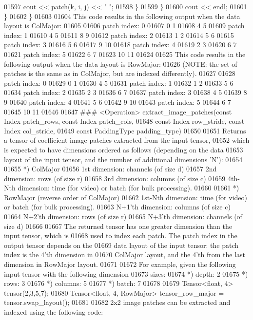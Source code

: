 \begin{DoxyCode}
01597           cout << patch(k, i, j) << " ";
01598         \}
01599       \}
01600       cout << endl;
01601     \}
01602   \}
01603 
01604 This code results in the following output when the data layout is ColMajor:
01605 
01606 patch index: 0
01607 0 1
01608 4 5
01609 patch index: 1
01610 4 5
01611 8 9
01612 patch index: 2
01613 1 2
01614 5 6
01615 patch index: 3
01616 5 6
01617 9 10
01618 patch index: 4
01619 2 3
01620 6 7
01621 patch index: 5
01622 6 7
01623 10 11
01624 
01625 This code results in the following output when the data layout is RowMajor:
01626 (NOTE: the set of patches is the same as in ColMajor, but are indexed differently).
01627 
01628 patch index: 0
01629 0 1
01630 4 5
01631 patch index: 1
01632 1 2
01633 5 6
01634 patch index: 2
01635 2 3
01636 6 7
01637 patch index: 3
01638 4 5
01639 8 9
01640 patch index: 4
01641 5 6
01642 9 10
01643 patch index: 5
01644 6 7
01645 10 11
01646 
01647 ### <Operation>  extract\_image\_patches(const Index patch\_rows, const Index patch\_cols,
01648                           const Index row\_stride, const Index col\_stride,
01649                           const PaddingType padding\_type)
01650 
01651 Returns a tensor of coefficient image patches extracted from the input tensor,
01652 which is expected to have dimensions ordered as follows (depending on the data
01653 layout of the input tensor, and the number of additional dimensions 'N'):
01654 
01655 *) ColMajor
01656 1st dimension: channels (of size d)
01657 2nd dimension: rows (of size r)
01658 3rd dimension: columns (of size c)
01659 4th-Nth dimension: time (for video) or batch (for bulk processing).
01660 
01661 *) RowMajor (reverse order of ColMajor)
01662 1st-Nth dimension: time (for video) or batch (for bulk processing).
01663 N+1'th dimension: columns (of size c)
01664 N+2'th dimension: rows (of size r)
01665 N+3'th dimension: channels (of size d)
01666 
01667 The returned tensor has one greater dimension than the input tensor, which is
01668 used to index each patch. The patch index in the output tensor depends on the
01669 data layout of the input tensor: the patch index is the 4'th dimension in
01670 ColMajor layout, and the 4'th from the last dimension in RowMajor layout.
01671 
01672 For example, given the following input tensor with the following dimension
01673 sizes:
01674  *) depth:   2
01675  *) rows:    3
01676  *) columns: 5
01677  *) batch:   7
01678 
01679   Tensor<float, 4> tensor(2,3,5,7);
01680   Tensor<float, 4, RowMajor> tensor\_row\_major = tensor.swap\_layout();
01681 
01682 2x2 image patches can be extracted and indexed using the following code:

\end{DoxyCode}
